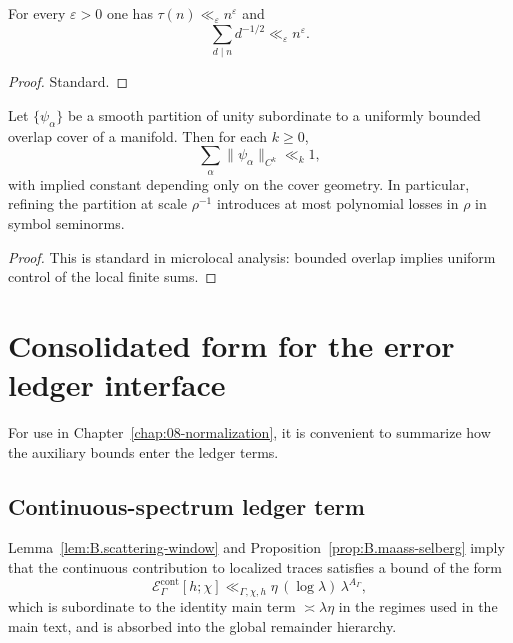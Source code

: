 \begin{lemma}
\label{lem:B.divisor}
For every $\varepsilon>0$ one has $\tau(n)\ll_\varepsilon n^\varepsilon$ and
\[
\sum_{d\mid n} d^{-1/2} \ll_\varepsilon n^\varepsilon.
\]
\end{lemma}

\begin{proof}
Standard.
\end{proof}

\begin{lemma}
\label{lem:B.partition-stability}
Let $\{\psi_\alpha\}$ be a smooth partition of unity subordinate to a uniformly bounded overlap cover of a manifold.
Then for each $k\ge 0$,
\[
\sum_\alpha \|\psi_\alpha\|_{C^k}\ll_k 1,
\]
with implied constant depending only on the cover geometry.  In particular, refining the partition at scale
$\rho^{-1}$ introduces at most polynomial losses in $\rho$ in symbol seminorms.
\end{lemma}

\begin{proof}
This is standard in microlocal analysis: bounded overlap implies uniform control of the local finite sums.
\end{proof}

\section{Consolidated form for the error ledger interface}
\label{sec:B.ledger-interface}

For use in Chapter~\ref{chap:08-normalization}, it is convenient to summarize how the auxiliary bounds enter the
ledger terms.

\subsection{Continuous-spectrum ledger term}
\label{subsec:B.ledger-cont}

Lemma~\ref{lem:B.scattering-window} and Proposition~\ref{prop:B.maass-selberg} imply that the continuous contribution
to localized traces satisfies a bound of the form
\begin{equation}
\label{eq:B.cont-ledger}
\mathcal{E}^{\mathrm{cont}}_\Gamma[h;\chi]
\ll_{\Gamma,\chi,h}
\eta\,(\log\lambda)\,\lambda^{A_\Gamma},
\end{equation}
which is subordinate to the identity main term $\asymp \lambda\eta$ in the regimes used in the main text, and is
absorbed into the global remainder hierarchy.

